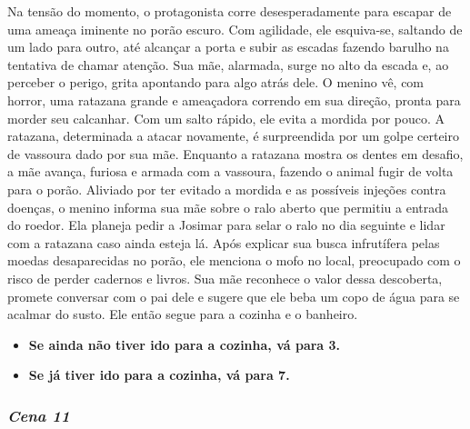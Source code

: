 Na tensão do momento, o protagonista corre desesperadamente para escapar de uma ameaça iminente no porão escuro. Com agilidade, ele esquiva-se, saltando de um lado para outro, até alcançar a porta e subir as escadas fazendo barulho na tentativa de chamar atenção. Sua mãe, alarmada, surge no alto da escada e, ao perceber o perigo, grita apontando para algo atrás dele. O menino vê, com horror, uma ratazana grande e ameaçadora correndo em sua direção, pronta para morder seu calcanhar. Com um salto rápido, ele evita a mordida por pouco. A ratazana, determinada a atacar novamente, é surpreendida por um golpe certeiro de vassoura dado por sua mãe. Enquanto a ratazana mostra os dentes em desafio, a mãe avança, furiosa e armada com a vassoura, fazendo o animal fugir de volta para o porão. Aliviado por ter evitado a mordida e as possíveis injeções contra doenças, o menino informa sua mãe sobre o ralo aberto que permitiu a entrada do roedor. Ela planeja pedir a Josimar para selar o ralo no dia seguinte e lidar com a ratazana caso ainda esteja lá. Após explicar sua busca infrutífera pelas moedas desaparecidas no porão, ele menciona o mofo no local, preocupado com o risco de perder cadernos e livros. Sua mãe reconhece o valor dessa descoberta, promete conversar com o pai dele e sugere que ele beba um copo de água para se acalmar do susto. Ele então segue para a cozinha e o banheiro.

\begin{itemize}
	\item \textbf{Se ainda não tiver ido para a cozinha, vá para 3.}
	\item \textbf{Se já tiver ido para a cozinha, vá para 7.}
\end{itemize}


\bigskip\medskip

\subsubsection*{\textit{\textbf{Cena 11}}}

